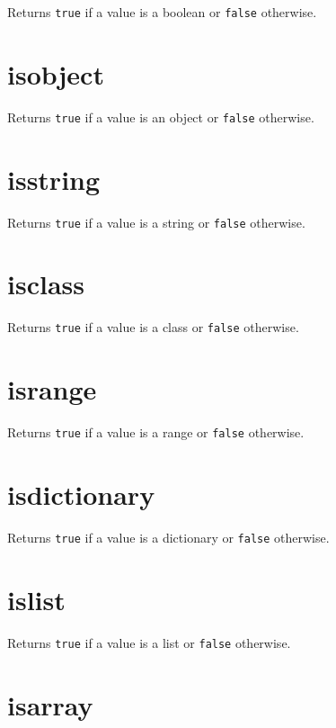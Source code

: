 Returns \texttt{true} if a value is a boolean or \texttt{false}
otherwise.

\hypertarget{isobject}{%
\section{isobject}\label{isobject}}

Returns \texttt{true} if a value is an object or \texttt{false}
otherwise.

\hypertarget{isstring}{%
\section{isstring}\label{isstring}}

Returns \texttt{true} if a value is a string or \texttt{false}
otherwise.

\hypertarget{isclass}{%
\section{isclass}\label{isclass}}

Returns \texttt{true} if a value is a class or \texttt{false} otherwise.

\hypertarget{isrange}{%
\section{isrange}\label{isrange}}

Returns \texttt{true} if a value is a range or \texttt{false} otherwise.

\hypertarget{isdictionary}{%
\section{isdictionary}\label{isdictionary}}

Returns \texttt{true} if a value is a dictionary or \texttt{false}
otherwise.

\hypertarget{islist}{%
\section{islist}\label{islist}}

Returns \texttt{true} if a value is a list or \texttt{false} otherwise.

\hypertarget{isarray}{%
\section{isarray}\label{isarray}}

